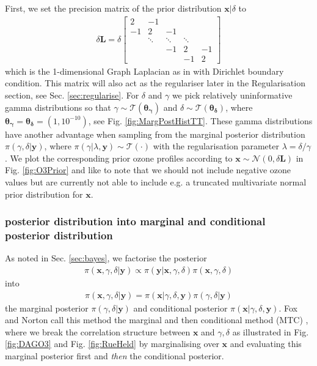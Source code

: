 First, we set the precision matrix of the prior distribution $\bm{x}|\delta$ to
\begin{align}
	\delta \bm{L} =
	\delta
	\begin{bmatrix}
		2 & -1 & & &  \\
		-1 & 2 & -1 & &   \\
		& \ddots & \ddots & \ddots &\\ 
		& & -1 & 2 & -1  \\
		& & & -1 & 2 
	\end{bmatrix} 
	\label{eq:GLapl} 
\end{align}
which is the 1-dimensional Graph Laplacian as in \cite{wang2015graphs,fox2016fast} with Dirichlet boundary condition.
This matrix will also act as the regulariser later in the Regularisation section, see Sec. \ref{sec:regularise}.
For $\delta$ and $\gamma$ we pick  relatively uninformative gamma distributions so that $\gamma \sim \mathcal{T}(\bm{\theta_{\gamma}}) $ and $\delta \sim \mathcal{T}(\bm{\theta_{\delta}})$, where $\bm{\theta_{\gamma}} = \bm{\theta_{\delta}} = (1,10^{-10})$, see Fig. \ref{fig:MargPostHistTT}.
These gamma distributions have another advantage when sampling from the marginal posterior distribution $\pi(\gamma,\delta | \bm{y})$, where $\pi(\gamma | \lambda, \bm{y}) \sim \mathcal{T}(\cdot)$ with the regularisation parameter $\lambda = \delta / \gamma $.
We plot the corresponding prior ozone profiles according to $\bm{x}\sim \mathcal{N}(0, \delta \bm{L})$ in Fig. \ref{fig:O3Prior} and like to note that we should not include negative ozone values but are currently not able to include e.g. a truncated multivariate normal prior distribution for $\bm{x}$. 



\subsubsection{posterior distribution into marginal and conditional posterior distribution}
\label{subsec:MTC}
As noted in Sec. \ref{sec:bayes}, we factorise the posterior
\begin{align}
	\pi( \bm{x}, \gamma, \delta| \bm{y}) \propto \pi(\bm{y}| \bm{x}, \gamma, \delta) \pi( \bm{x}, \gamma, \delta)
\end{align}
into 
\begin{align}
	\pi( \bm{x}, \gamma, \delta| \bm{y}) =\pi( \bm{x}|\gamma, \delta, \bm{y})\pi(\gamma, \delta | \bm{y})
\end{align}
the marginal posterior $\pi(\gamma, \delta | \bm{y})$ and conditional posterior $\pi( \bm{x}|\gamma, \delta, \bm{y})$.
Fox and Norton call this method the marginal and then conditional method (MTC) \cite{fox2016fast}, where we break the correlation structure between $\bm{x}$ and $\gamma, \delta$ as illustrated in Fig. \ref{fig:DAGO3} and Fig. \ref{fig:RueHeld} by marginalising over $\bm{x}$ and evaluating this marginal posterior first and \textit{then} the conditional posterior.

